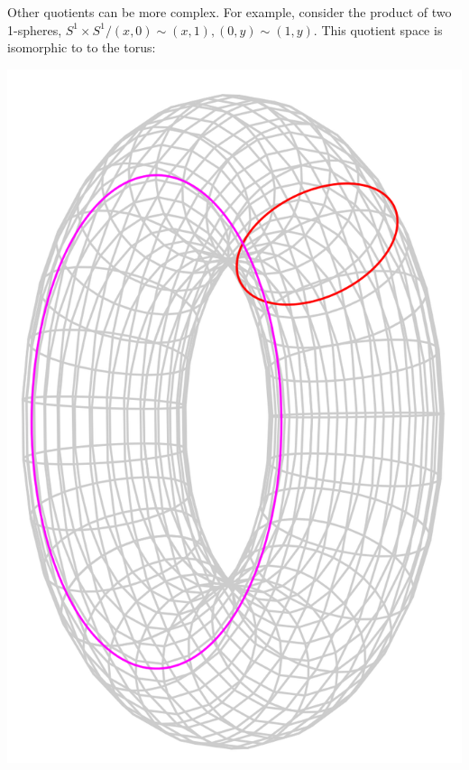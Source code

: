 \documentclass[tikz]{beamer}
\theoremstyle{definition}
\begin{document}
\frame
{
	Other quotients can be more complex. For example, consider the product of two 1-spheres, $S^1 \times S^1 / (x,0) \sim (x,1), (0, y) \sim (1, y)$. This quotient space is isomorphic to to the torus: 
	
	\begin{center}
		\includegraphics[scale=0.1]{torus_skeleton}
	\end{center}
	 
}
\end{document}
